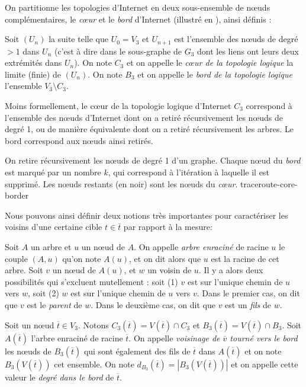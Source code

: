 On partitionne les topologies d'Internet en deux sous-ensemble de n\oe{}uds
complémentaires, le {\em cœur} et le {\em bord} d'Internet (illustré en
), ainsi définis :

\begin{definition} Soit $(U_n)$ la suite telle que
$U_0 = V_3$ et $U_{n+1}$ est l'ensemble des n\oe{}uds de degré $> 1$ dans $U_n$
(c'est à dire dans le sous-graphe de $G_3$ dont les liens ont leurs deux
extrémités dans $U_n$).
On note $C_3$ et on appelle le {\em cœur de la topologie logique} la limite
(finie) de $(U_n)$. On note $B_3$ et on appelle le {\em bord de la topologie
logique} l'ensemble $V_3 \setminus C_3$.
\end{definition}

Moins formellement, le cœur de la topologie logique d'Internet $C_3$ correspond
à l'ensemble des n\oe{}uds d'Internet dont on a retiré récursivement les n\oe{}uds de
degré 1, ou de manière équivalente dont on a retiré récursivement les arbres. Le
bord correspond aux n\oe{}uds ainsi retirés.

 {On retire
récursivement les n\oe{}uds de degré 1 d'un graphe. Chaque n\oe{}ud du {\em
bord} est marqué par un nombre $k$, qui correspond à l'itération à laquelle il
est supprimé. Les n\oe{}uds restants (en noir) sont les n\oe{}uds du {\em
cœur}.} {traceroute-core-border}

Nous pouvons ainsi définir deux notions très importantes pour caractériser les
voisins d'une certaine cible $t \in \overline{t}$ par rapport à la mesure:

\begin{definition}
Soit $A$ un arbre et $u$ un n\oe{}ud de $A$. On appelle {\em arbre enraciné} de
racine $u$ le couple $(A, u)$ qu'on note $A(u)$, et on dit alors que $u$ est la
racine de cet arbre. Soit $v$ un n\oe{}ud de $A(u)$, et $w$ un voisin de $u$. Il
y a alors deux possibilités qui s'excluent mutellement : soit (1) $v$ est sur
l'unique chemin de $u$ vers $w$, soit (2) $w$ est sur l'unique chemin de $u$
vers $v$. Dans le premier cas, on dit que $v$ est le {\em parent} de $w$. Dans
le deuxième cas, on dit que $v$ est un {\em fils} de $w$.
\end{definition}

\begin{definition} Soit un n\oe{}ud $\overline{t} \in V_3$. Notons $C_3(\overline{t}) =
V(\overline{t}) \cap C_3$ et $B_3(\overline{t}) = V(\overline{t}) \cap B_3$.
Soit $A(\overline{t})$ l'arbre enraciné de racine $\overline{t}$. On appelle
{\em voisinage de $\overline{v}$ tourné vers le bord} les n\oe{}uds de
$B_3(\overline{t})$ qui sont également des fils de $\overline{t}$ dans
$A(\overline{t})$ et on note $B_3(V(\overline{t}))$ cet ensemble. On note
$d_{B_3}(\overline{t}) = |B_3(V(\overline{t}))|$ et on appelle cette valeur le
{\em degré dans le bord} de $\overline{t}$.
\end{definition}

